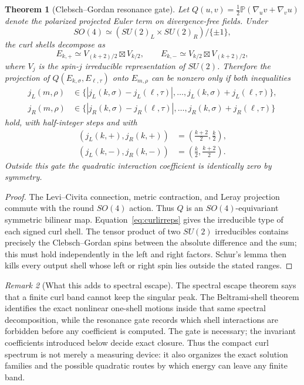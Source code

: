 \documentclass[aps,prd,reprint,superscriptaddress,nofootinbib,floatfix]{revtex4-2}
\newtheorem{theorem}{Theorem}
\theoremstyle{definition}
\theoremstyle{remark}
\newtheorem{remark}[theorem]{Remark}
\newcommand{\PP}{\mathbb{P}}
\begin{document}
\begin{theorem}[Clebsch--Gordan resonance gate]\label{thm:CGgate}
	Let $Q(u,v)=\frac12\PP(\nabla_u v+\nabla_v u)$ denote the polarized projected Euler term on divergence-free
	fields.  Under
	\[
		SO(4)\simeq(SU(2)_L\times SU(2)_R)/\{\pm1\},
	\]
	the curl shells decompose as
	\begin{equation}
		E_{k,+}\simeq V_{(k+2)/2}\boxtimes V_{k/2},
		\qquad
		E_{k,-}\simeq V_{k/2}\boxtimes V_{(k+2)/2},
		\label{eq:curlirreps}
	\end{equation}
	where $V_j$ is the spin-$j$ irreducible representation of $SU(2)$.  Therefore
	the projection of $Q(E_{k,\sigma},E_{\ell,\tau})$ onto $E_{m,\rho}$ can be
	nonzero only if both inequalities
	\begin{align}
		j_L(m,\rho) & \in
		\{|j_L(k,\sigma)-j_L(\ell,\tau)|,\ldots,
		j_L(k,\sigma)+j_L(\ell,\tau)\}, \\
		j_R(m,\rho) & \in
		\{|j_R(k,\sigma)-j_R(\ell,\tau)|,\ldots,
		j_R(k,\sigma)+j_R(\ell,\tau)\}
	\end{align}
	hold, with half-integer steps and with
	\begin{align}
		(j_L(k,+),j_R(k,+))
		 & =\left(\frac{k+2}{2},\frac k2\right), \\
		(j_L(k,-),j_R(k,-))
		 & =\left(\frac k2,\frac{k+2}{2}\right).
	\end{align}
	Outside this gate the quadratic interaction coefficient is identically zero by
	symmetry.
\end{theorem}

\begin{proof}
	The Levi--Civita connection, metric contraction, and Leray projection commute
	with the round $SO(4)$ action.  Thus $Q$ is an $SO(4)$-equivariant symmetric bilinear map.
	Equation~\eqref{eq:curlirreps} gives the irreducible type of each signed curl
	shell.  The tensor product of two $SU(2)$ irreducibles contains precisely the
	Clebsch--Gordan spins between the absolute difference and the sum; this must hold
	independently in the left and right factors.  Schur's lemma then kills every
	output shell whose left or right spin lies outside the stated ranges.
\end{proof}

\begin{remark}[What this adds to spectral escape]
	The spectral escape theorem says that a finite curl band cannot keep the
	singular peak.  The Beltrami-shell theorem identifies the exact nonlinear
	one-shell motions inside that same spectral decomposition, while the resonance
	gate records which shell interactions are forbidden before any coefficient is
	computed.  The gate is necessary; the invariant coefficients introduced below decide exact closure.  Thus the compact curl spectrum is not merely a measuring device: it
	also organizes the exact solution families and the possible quadratic routes by
	which energy can leave any finite band.
\end{remark}
\end{document}

